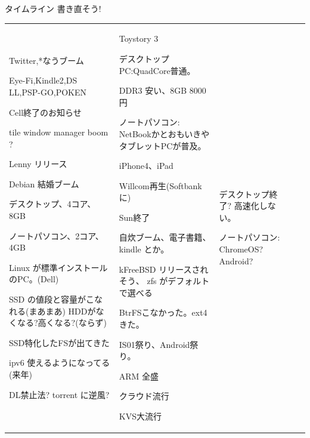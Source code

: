 \begin{frame}{タイムライン 書き直そう!}
{\begin{tabular}[t]{|p{4em}|p{4em}|p{9em}|p{7em}|p{6em}|}
Twitter,*なうブーム

Eye-Fi,Kindle2,DS LL,PSP-GO,POKEN

Cell終了のお知らせ

tile window manager boom ?

Lenny リリース

Debian 結婚ブーム

デスクトップ、4コア、8GB

ノートパソコン、2コア、4GB

Linux が標準インストールのPC。(Dell)

SSD の値段と容量がこなれる(まあまあ)
HDDがなくなる?高くなる?(ならず)

SSD特化したFSが出てきた

ipv6 使えるようになってる(来年)

DL禁止法? torrent に逆風?

&

Toystory 3

デスクトップPC:QuadCore普通。

DDR3 安い、8GB 8000円

ノートパソコン:
NetBookかとおもいきやタブレットPCが普及。

iPhone4、iPad

Willcom再生(Softbankに)

Sun終了




自炊ブーム、電子書籍、kindle とか。

kFreeBSD リリースされそう、
zfs がデフォルトで選べる

BtrFSこなかった。ext4 きた。

IS01祭り、Android祭り。

ARM 全盛

クラウド流行

KVS大流行



&

デスクトップ終了?
高速化しない。

ノートパソコン:
ChromeOS?
Android?


\end{tabular}}
\end{frame}

